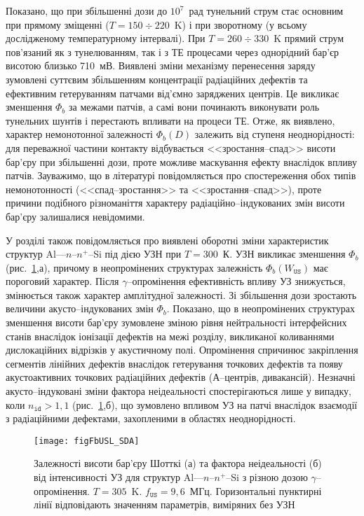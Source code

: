 Показано, що
при збільшенні дози до $10^7$~рад тунельний струм стає основним
при прямому зміщенні ($T=150\div220$~K) і при зворотному (у всьому дослідженому температурному інтервалі).
При $T=260\div330$~K прямий струм пов'язаний як з тунелюванням, так і з ТЕ процесами через однорідний бар'єр висотою близько 710~мВ.
Виявлені зміни механізму перенесення заряду зумовлені суттєвим збільшенням концентрації радіаційних дефектів та ефективним гетеруванням патчами від'ємно заряджених центрів.
Це викликає  зменшення $\Phi_b$ за межами патчів, а самі вони починають виконувати роль тунельних шунтів і перестають впливати на процеси ТЕ.
Отже, як виявлено, характер немонотонної залежності $\Phi_b(D)$ залежить від ступеня неоднорідності:
для переважної частини контакту відбувається <<зростання--спад>> висоти бар'єру при збільшенні дози, проте можливе маскування ефекту внаслідок впливу патчів.
Зауважимо, що в літературі повідомляється про спостереження обох типів немонотонності (<<спад--зростання>> та <<зростання--спад>>),
проте причини подібного різноманіття характеру радіаційно--індукованих змін висоти бар'єру залишалися невідомими.

У розділі також повідомляється про виявлені оборотні зміни характеристик структур Al---$n$--$n^+$--Si під дією УЗН при $T\!=\!300$~К.
УЗН викликає зменшення $\Phi_b$ (рис.~\ref{figFbUSL_SDA},а), причому
в неопромінених структурах залежність $\Phi_b(W_\mathtt{US})$ має пороговий характер.
Після $\gamma$--опромінення ефективність впливу УЗ знижується, змінюється також характер амплітудної залежності.
Зі збільшення дози зростають величини акусто--індукованих змін $\Phi_b$.
Показано, що в неопромінених структурах зменшення висоти бар'єру зумовлене зміною рівня нейтральності інтерфейсних станів
внаслідок іонізації дефектів на межі розділу, викликаної коливаннями дислокаційних відрізків у акустичному полі.
Опромінення спричинює закріплення сегментів лінійних дефектів внаслідок гетерування точкових дефектів та
появу акустоактивних точкових радіаційних дефектів (А--центрів, дивакансій).
Незначні акусто--індуковані зміни фактора неідеальності спостерігаються лише у випадку, коли $n_\mathtt{id}>1,1$ (рис.~\ref{figFbUSL_SDA},б),
що зумовлено впливом УЗ на патчі внаслідок взаємодії з радіаційними дефектами, захопленими в областях неоднорідності.

\begin{figure}
\center
\texttt{[image: figFbUSL\_SDA]}
\caption{\label{figFbUSL_SDA}
Залежності висоти бар'єру Шотткі (а) та фактора неідеальності (б)  від інтенсивності УЗ для
структур Al---$n$--$n^+$--Si з різною дозою $\gamma$--опромінення.
$T=305$~K.
$f_\mathtt{US}=9,6$~МГц.
Горизонтальні пунктирні лінії відповідають значенням параметрів, виміряних без УЗН
}%
\end{figure}

